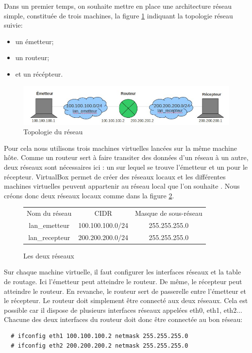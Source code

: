 \documentclass[a4paper]{article}
\begin{document}
Dans un premier temps, on souhaite mettre en place une
architecture réseau simple, constituée de trois machines, la
figure \ref{topo} indiquant la topologie réseau suivie:
\begin{itemize}
	\item un émetteur;
	\item un routeur;
	\item et un récépteur.
\end{itemize}

\begin{figure}[!ht]
	\centering
	\includegraphics[scale=.5]{topo.jpg}
	\caption{\label{topo} Topologie du réseau}
\end{figure}

Pour cela nous utilisons trois machines virtuelles lancées sur la même machine hôte. 
Comme un routeur sert à faire transiter des données d'un réseau à un autre, deux
réseaux sont nécessaires ici : un sur lequel se trouve l'émetteur et un pour le récepteur.
VirtualBox permet de créer des réseaux locaux et les différentes machines virtuelles
 peuvent appartenir au réseau local que l’on souhaite \cite{virtualbx}. Nous créons donc deux réseaux locaux 
 comme dans la figure \ref{reseaux1}.

\begin{figure}[!ht]
	\centering
	\begin{tabular}{c|c|c}
	Nom du réseau & CIDR & Masque de sous-réseau\\
	lan\_emetteur & 100.100.100.0/24 & 255.255.255.0\\
	lan\_recepteur & 200.200.200.0/24 & 255.255.255.0\\
	\end{tabular}
	\caption{\label{reseaux1} Les deux réseaux}
\end{figure}

Sur chaque machine virtuelle, il faut configurer les interfaces réseaux et la table de routage. 
Ici l'émetteur peut atteindre le routeur. De même, le récepteur peut atteindre le routeur. 
En revanche, le routeur sert de passerelle entre l'émetteur et le récepteur.
Le routeur doit simplement être connecté aux deux réseaux.
Cela est possible car il dispose de plusieurs interfaces réseaux appelées eth0, eth1, eth2...
Chacune des deux interfaces du routeur doit donc être
connectée au bon réseau:
\begin{verbatim}
  # ifconfig eth1 100.100.100.2 netmask 255.255.255.0
  # ifconfig eth2 200.200.200.2 netmask 255.255.255.0
\end{verbatim}
\end{document}
